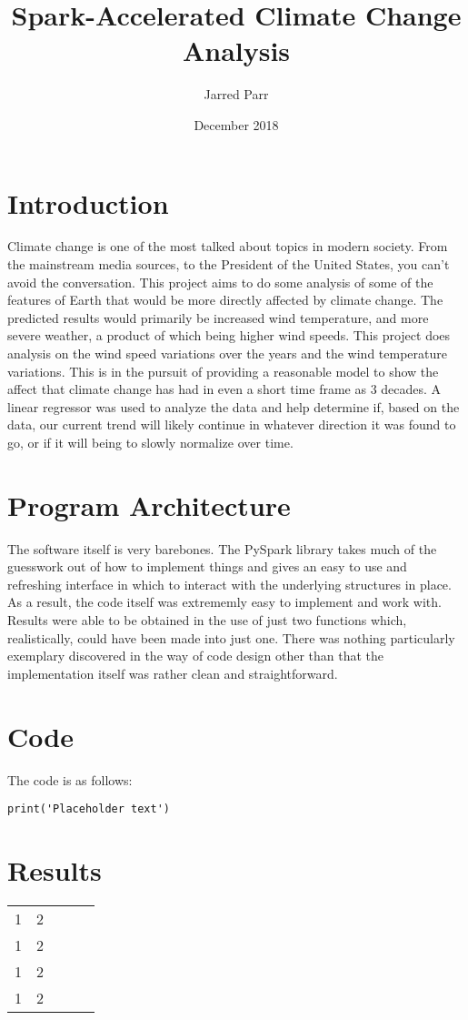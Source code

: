 \documentclass[11pt]{article}
\begin{document}
\title{Spark-Accelerated Climate Change Analysis}
\author{Jarred Parr}
\date{December 2018}
\maketitle

\section{Introduction}
Climate change is one of the most talked about topics in modern society. From the mainstream media sources, to the President of
the United States, you can't avoid the conversation. This project aims to do some analysis of some of the features of Earth that
would be more directly affected by climate change. The predicted results would primarily be increased wind temperature, and more
severe weather, a product of which being higher wind speeds. This project does analysis on the wind speed variations over the
years and the wind temperature variations. This is in the pursuit of providing a reasonable model to show the affect that climate
change has had in even a short time frame as 3 decades. A linear regressor was used to analyze the data and help determine if,
based on the data, our current trend will likely continue in whatever direction it was found to go, or if it will being to
slowly normalize over time.

\section{Program Architecture}
The software itself is very barebones. The PySpark library takes much of the guesswork out of how to implement things and gives
an easy to use and refreshing interface in which to interact with the underlying structures in place. As a result, the code itself
was extrememly easy to implement and work with. Results were able to be obtained in the use of just two functions which,
realistically, could have been made into just one. There was nothing particularly exemplary discovered in the way of code design
other than that the implementation itself was rather clean and straightforward.

\section{Code}
The code is as follows:

\lstset{frame=tb, language=python}
\begin{lstlisting}
print('Placeholder text')
\end{lstlisting}

\section{Results}
\begin{table}[htb]
\begin{tabular}{lllll}
 1  &  2  &  \\
 1  &  2  &  \\
 1  &  2  &  \\
 1  &  2  &
\end{tabular}
\end{table}
\end{document}
